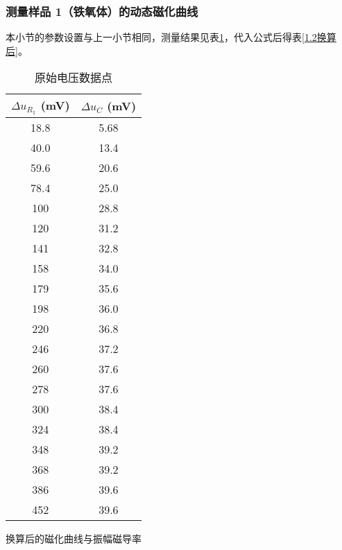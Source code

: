 \documentclass[11pt]{article}
\begin{document}
	\subsubsection{测量样品 1（铁氧体）的动态磁化曲线}
	本小节的参数设置与上一小节相同，测量结果见表\ref{1.2电压}，代入公式后得表\ref{1.2换算后}。
	\begin{center}
		\noindent\begin{minipage}{0.25\columnwidth}
			\begin{table}[H]\centering
				\caption{原始电压数据点}
				\label{1.2电压}
				\begin{tabular}{cc}\toprule
					$\Delta u_{R_1}$ (mV) & $\Delta u_{C}$ (mV) \\
					\midrule
					18.8    & 5.68 \\
					40.0    & 13.4 \\
					59.6    & 20.6 \\
					78.4    & 25.0 \\
					100     & 28.8 \\
					120     & 31.2 \\
					141     & 32.8 \\
					158     & 34.0 \\
					179     & 35.6 \\
					198     & 36.0 \\
					220     & 36.8 \\
					246     & 37.2 \\
					260     & 37.6 \\
					278     & 37.6 \\
					300     & 38.4 \\
					324     & 38.4 \\
					348     & 39.2 \\
					368     & 39.2 \\
					386     & 39.6 \\
					452     & 39.6 \\
					\bottomrule
				\end{tabular}
			\end{table}
		\end{minipage}\begin{minipage}{0.4\columnwidth}
			\begin{table}[H]\centering
				\caption{换算后的磁化曲线与振幅磁导率}
				\label{1.2换算后}

\end{table}
\end{minipage}
\end{center}
\end{document}

